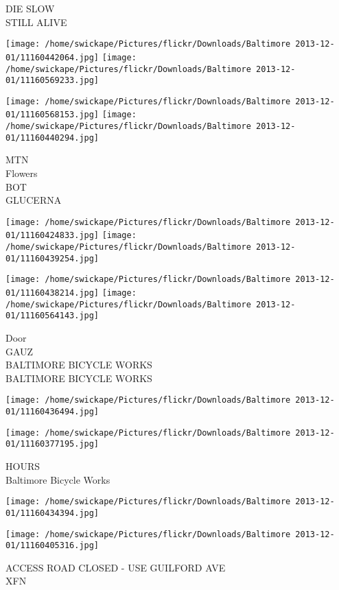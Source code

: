 \documentclass[10pt,letterpaper]{article}
\begin{document}
DIE SLOW\\
STILL ALIVE
\pagebreak

\texttt{[image: /home/swickape/Pictures/flickr/Downloads/Baltimore 2013-12-01/11160442064.jpg]}
\texttt{[image: /home/swickape/Pictures/flickr/Downloads/Baltimore 2013-12-01/11160569233.jpg]}

\texttt{[image: /home/swickape/Pictures/flickr/Downloads/Baltimore 2013-12-01/11160568153.jpg]}
\texttt{[image: /home/swickape/Pictures/flickr/Downloads/Baltimore 2013-12-01/11160440294.jpg]}

MTN\\
Flowers\\
BOT\\
GLUCERNA
\pagebreak

\texttt{[image: /home/swickape/Pictures/flickr/Downloads/Baltimore 2013-12-01/11160424833.jpg]}
\texttt{[image: /home/swickape/Pictures/flickr/Downloads/Baltimore 2013-12-01/11160439254.jpg]}

\texttt{[image: /home/swickape/Pictures/flickr/Downloads/Baltimore 2013-12-01/11160438214.jpg]}
\texttt{[image: /home/swickape/Pictures/flickr/Downloads/Baltimore 2013-12-01/11160564143.jpg]}

Door\\
GAUZ\\
BALTIMORE BICYCLE WORKS\\
BALTIMORE BICYCLE WORKS
\pagebreak

\texttt{[image: /home/swickape/Pictures/flickr/Downloads/Baltimore 2013-12-01/11160436494.jpg]}

\vspace{0.25in}
\texttt{[image: /home/swickape/Pictures/flickr/Downloads/Baltimore 2013-12-01/11160377195.jpg]}

HOURS\\
Baltimore Bicycle Works
\pagebreak

\texttt{[image: /home/swickape/Pictures/flickr/Downloads/Baltimore 2013-12-01/11160434394.jpg]}

\vspace{0.25in}
\texttt{[image: /home/swickape/Pictures/flickr/Downloads/Baltimore 2013-12-01/11160405316.jpg]}

ACCESS ROAD CLOSED {-} USE GUILFORD AVE\\
XFN
\pagebreak
\end{document}

